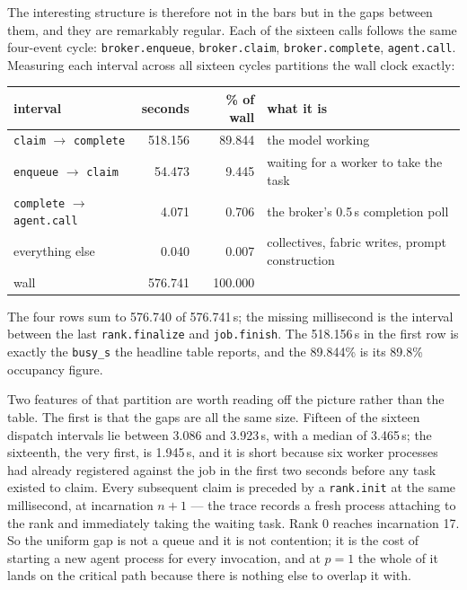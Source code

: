 \documentclass[11pt]{article}
\begin{document}
The interesting structure is therefore not in the bars but in the gaps between them, and they are
remarkably regular. Each of the sixteen calls follows the same four-event cycle:
\texttt{broker.enqueue}, \texttt{broker.claim}, \texttt{broker.complete}, \texttt{agent.call}.
Measuring each interval across all sixteen cycles partitions the wall clock exactly:

\begin{center}
\begin{tabular}{@{}lrrl@{}}
\toprule
  interval & seconds & \% of wall & what it is \\
\midrule
  \texttt{claim} $\to$ \texttt{complete} & 518.156 & 89.844 & the model working \\
  \texttt{enqueue} $\to$ \texttt{claim} & 54.473 & 9.445 & waiting for a worker to take the task \\
  \texttt{complete} $\to$ \texttt{agent.call} & 4.071 & 0.706 & the broker's 0.5\,s completion poll \\
  everything else & 0.040 & 0.007 & collectives, fabric writes, prompt construction \\
\midrule
  wall & 576.741 & 100.000 & \\
\bottomrule
\end{tabular}
\end{center}

The four rows sum to 576.740 of 576.741\,s; the missing millisecond is the interval between the
last \texttt{rank.finalize} and \texttt{job.finish}. The 518.156\,s in the first row is exactly
the \texttt{busy\_s} the headline table reports, and the 89.844\% is its 89.8\% occupancy figure.

Two features of that partition are worth reading off the picture rather than the table. The first
is that the gaps are all the same size. Fifteen of the sixteen dispatch intervals lie between
3.086 and 3.923\,s, with a median of 3.465\,s; the sixteenth, the very first, is 1.945\,s, and it
is short because six worker processes had already registered against the job in the first two
seconds before any task existed to claim. Every subsequent claim is preceded by a
\texttt{rank.init} at the same millisecond, at incarnation $n+1$ --- the trace records a fresh
process attaching to the rank and immediately taking the waiting task. Rank 0 reaches
incarnation 17. So the uniform gap is not a queue and it is not contention; it is the cost of
starting a new agent process for every invocation, and at $p=1$ the whole of it lands on the
critical path because there is nothing else to overlap it with.
\end{document}
